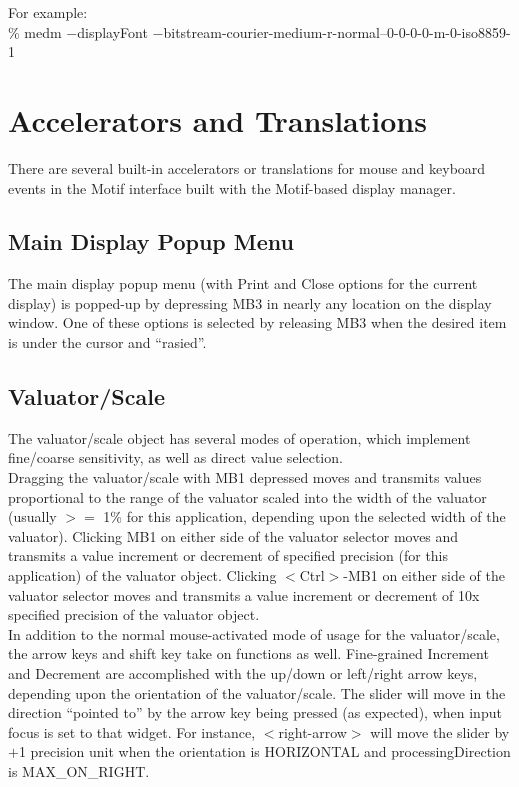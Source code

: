 \noindent For example:\\

\% medm $-$displayFont $-$bitstream-courier-medium-r-normal--0-0-0-0-m-0-iso8859-1\\



\section{Accelerators and Translations}

There are several built-in accelerators or translations for mouse and
keyboard events in the Motif interface built with the Motif-based display
manager.\\

\subsection{Main Display Popup Menu}

The main display popup menu (with Print and Close options for the current
display) is popped-up by depressing MB3 in nearly any location on the display
window. One of these options is selected by releasing MB3 when the desired
item is under the cursor and ``rasied''.


\subsection{Valuator/Scale}

The valuator/scale object has several modes of operation, which implement
fine/coarse sensitivity, as well as direct value selection.\\

\noindent Dragging the valuator/scale with MB1 depressed moves and transmits
values proportional to the range of the valuator scaled into the width of the
valuator (usually  $>=$ 1\% for this application, depending upon the selected
width of the valuator). Clicking MB1 on either side of the valuator selector
moves and transmits a value increment or decrement of specified precision
(for this application) of the valuator object.  Clicking $<$Ctrl$>$-MB1 on
either side of the valuator selector moves and transmits a value increment
or decrement of 10x specified precision of the valuator object.\\

\noindent In addition to the normal mouse-activated mode of usage for the
valuator/scale, the arrow keys and shift key take on functions as well.
Fine-grained Increment 
and Decrement are accomplished with the up/down or left/right arrow keys, 
depending upon the orientation of the valuator/scale.  The slider will move 
in the direction ``pointed to'' by the arrow key being pressed (as expected), 
when input focus is set to that widget.  For instance, $<$right-arrow$>$ will 
move the slider by $+$1 precision unit when the orientation is HORIZONTAL and 
processingDirection is MAX\_ON\_RIGHT.\\

